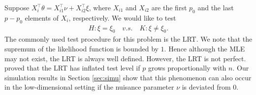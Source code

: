 \documentclass[11pt]{article}
\newcommand{\myT}{\intercal}
\theoremstyle{plain}
\theoremstyle{definition}
\theoremstyle{remark}
\begin{document}
    Suppose $X_i^\myT \theta = X_{i1}^\myT \nu + X_{i2}^\myT \xi$, where $X_{i1}$ and $X_{i2}$ are the first $p_0$ and the last $p-p_0$ elements of $X_i$, respectively.
    We would like to test 
\begin{align*}
    H:\xi= \xi_0 \quad v.s.\quad K: \xi\neq \xi_0. 
\end{align*}
The commonly used test procedure for this problem is the LRT.
We note that the supremum of the likelihood function is bounded by $1$.
Hence although the MLE may not exist, the LRT is always well defined.
However, the LRT is not perfect.
\cite{Sur2019The} proved that the LRT has inflated test level if $p$ grows proportionally with $n$.
Our simulation results in Section \ref{sec:simu} show that this phenomenon can also occur in the low-dimensional setting if the nuisance parameter $\nu$ is deviated from $0$.
\end{document}
